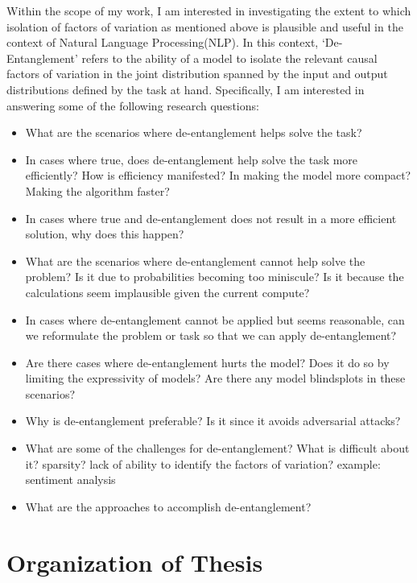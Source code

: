 Within the scope of my work, I am interested in investigating the extent to which  isolation of factors of variation as mentioned above is plausible and useful in the context of Natural Language Processing(NLP). In this context, `De-Entanglement' refers to the ability of a model to isolate the relevant causal factors of variation in the joint distribution spanned by the input and output distributions defined by the task at hand. Specifically, I am interested in answering some of the following research questions:
\begin{itemize}
    \item What are the scenarios where de-entanglement helps solve the task?
    \item In cases where true, does de-entanglement help solve the task more efficiently? How is efficiency manifested? In making the model more compact? Making the algorithm faster?
    \item In cases where true and de-entanglement does not result in a more efficient solution, why does this happen? 
    \item What are the scenarios where de-entanglement cannot help solve the problem? Is it due to probabilities becoming too miniscule? Is it because the calculations seem implausible given the current compute? 
    \item In cases where de-entanglement cannot be applied but seems reasonable, can we reformulate the problem or task so that we can apply de-entanglement? 
    \item Are there cases where de-entanglement hurts the model? Does it do so by limiting the expressivity of models? Are there any model blindsplots in these scenarios? 
    \item Why is de-entanglement preferable? Is it since it avoids adversarial attacks?
    \item What are some of the challenges for de-entanglement? What is difficult about it? sparsity? lack of ability to identify the factors of variation? example: sentiment analysis
    \item What are the approaches to accomplish de-entanglement? 
    
\end{itemize}



\section{Organization of Thesis}

